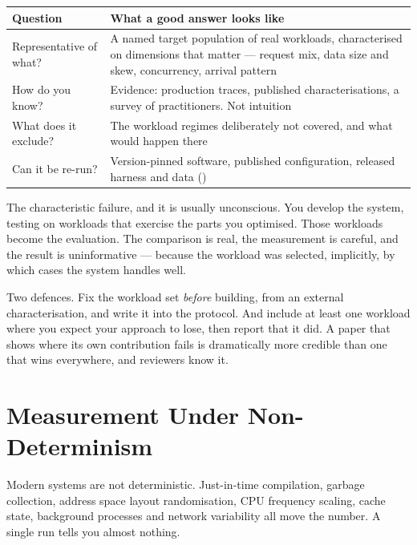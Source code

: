 \begin{center}
\small
\begin{tabular}{@{}L{3.2cm}L{11.1cm}@{}}
\toprule
\textbf{Question} & \textbf{What a good answer looks like} \\
\midrule
Representative of what?
  & A named target population of real workloads, characterised on dimensions
    that matter --- request mix, data size and skew, concurrency, arrival
    pattern \\
How do you know?
  & Evidence: production traces, published characterisations, a survey of
    practitioners. Not intuition \\
What does it exclude?
  & The workload regimes deliberately not covered, and what would happen there \\
Can it be re-run?
  & Version-pinned software, published configuration, released harness and
    data () \\
\bottomrule
\end{tabular}
\end{center}

\begin{pitfall}
The characteristic failure, and it is usually unconscious. You develop the
system, testing on workloads that exercise the parts you optimised. Those
workloads become the evaluation. The comparison is real, the measurement is
careful, and the result is uninformative --- because the workload was selected,
implicitly, by which cases the system handles well.

\medskip
Two defences. Fix the workload set \emph{before} building, from an external
characterisation, and write it into the protocol. And include at least one
workload where you expect your approach to lose, then report that it did. A
paper that shows where its own contribution fails is dramatically more credible
than one that wins everywhere, and reviewers know it.
\end{pitfall}

\section{Measurement Under Non-Determinism}

Modern systems are not deterministic. Just-in-time compilation, garbage
collection, address space layout randomisation, CPU frequency scaling, cache
state, background processes and network variability all move the number. A
single run tells you almost nothing.

